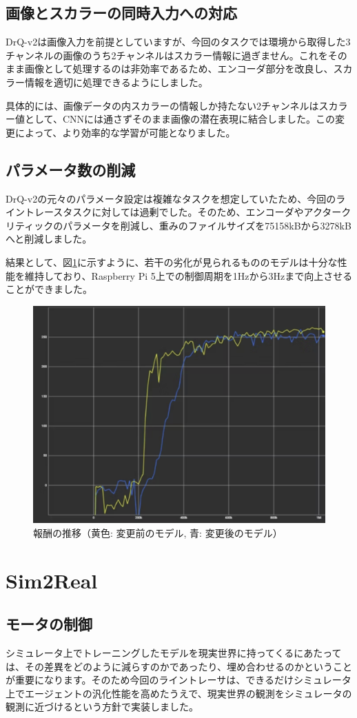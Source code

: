\subsection{画像とスカラーの同時入力への対応}
DrQ-v2は画像入力を前提としていますが、今回のタスクでは環境から取得した3チャンネルの画像のうち2チャンネルはスカラー情報に過ぎません。これをそのまま画像として処理するのは非効率であるため、エンコーダ部分を改良し、スカラー情報を適切に処理できるようにしました。

具体的には、画像データの内スカラーの情報しか持たない2チャンネルはスカラー値として、CNNには通さずそのまま画像の潜在表現に結合しました。この変更によって、より効率的な学習が可能となりました。

\subsection{パラメータ数の削減}
DrQ-v2の元々のパラメータ設定は複雑なタスクを想定していたため、今回のライントレースタスクに対しては過剰でした。そのため、エンコーダやアクタークリティックのパラメータを削減し、重みのファイルサイズを75158kBから3278kBへと削減しました。

結果として、図\ref{fig:image5}に示すように、若干の劣化が見られるもののモデルは十分な性能を維持しており、Raspberry Pi 5上での制御周期を1Hzから3Hzまで向上させることができました。
\begin{figure}[h]
  \centering
  \includegraphics[width=0.7\hsize]{line-tracer/fig/image5.png}
  \caption{報酬の推移（黄色: 変更前のモデル, 青: 変更後のモデル）}
  \label{fig:image5}
\end{figure}

\section{Sim2Real}

\subsection{モータの制御}
シミュレータ上でトレーニングしたモデルを現実世界に持ってくるにあたっては、その差異をどのように減らすのかであったり、埋め合わせるのかということが重要になります。そのため今回のライントレーサは、できるだけシミュレータ上でエージェントの汎化性能を高めたうえで、現実世界の観測をシミュレータの観測に近づけるという方針で実装しました。

